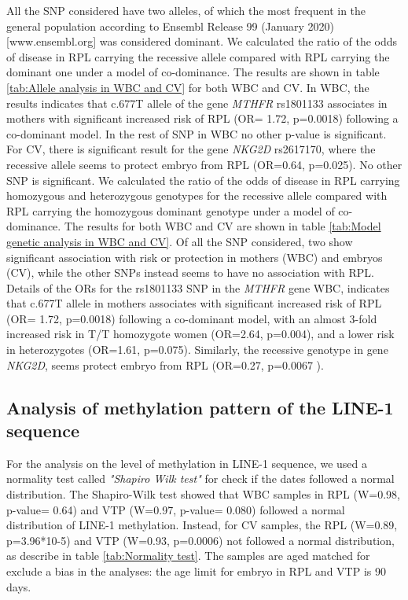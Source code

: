 \documentclass[journal,article,submit,moreauthors,pdftex]{Definitions/mdpi}
\begin{document}
\noindent All the SNP considered have two alleles, of which the most frequent in the general population according to Ensembl Release 99 (January 2020)[www.ensembl.org] was considered dominant. We calculated the ratio of the odds of disease in RPL carrying the recessive allele compared with RPL carrying the dominant one under a model of co-dominance. The results are shown in table \ref{tab:Allele analysis in WBC and CV} for both WBC and CV. In WBC, the results indicates that c.677T allele of the gene \textit{MTHFR} rs1801133 associates in mothers with significant increased risk of RPL (OR= 1.72, p=0.0018) following a co-dominant model. In the rest of SNP in WBC no other p-value is significant. For CV, there is significant result for the gene \textit{NKG2D} rs2617170, where the recessive allele seems to protect embryo from RPL (OR=0.64, p=0.025). No other SNP is significant. We calculated the ratio of the odds of disease in RPL carrying homozygous and heterozygous genotypes for the recessive allele compared with RPL carrying the homozygous dominant genotype under a model of co-dominance. The results for both WBC and CV are shown in table \ref{tab:Model genetic analysis in WBC and CV}. Of all the SNP considered, two show significant association with risk or protection in mothers (WBC) and embryos (CV), while the other SNPs instead seems to have no association with RPL. Details of the ORs for the rs1801133 SNP in the \textit{MTHFR} gene WBC, indicates that c.677T allele in mothers associates with significant increased risk of RPL (OR= 1.72, p=0.0018) following a co-dominant model, with an almost 3-fold increased risk in T/T homozygote women (OR=2.64, p=0.004), and a lower risk in heterozygotes (OR=1.61, p=0.075). Similarly, the recessive genotype in gene \textit{NKG2D}, seems protect embryo from RPL (OR=0.27, p=0.0067 ).

\subsection{Analysis of methylation pattern of the LINE-1 sequence}

\noindent For the analysis on the level of methylation in LINE-1 sequence, we used a normality test called \textit{"Shapiro Wilk test"} for check if the dates followed a normal distribution. The Shapiro-Wilk test showed that WBC samples in RPL (W=0.98, p-value= 0.64) and VTP (W=0.97, p-value= 0.080) followed a normal distribution of LINE-1 methylation. Instead, for CV samples, the RPL (W=0.89, p=3.96*10-5) and VTP (W=0.93, p=0.0006) not followed a normal distribution, as describe in table \ref{tab:Normality test}. The samples are aged matched for exclude a bias in the analyses: the age limit for embryo in RPL and VTP is 90 days. \\
\end{document}

